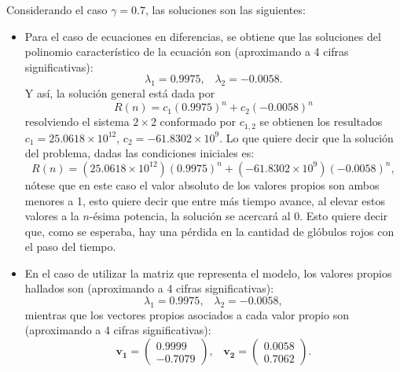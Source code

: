 Considerando el caso $\gamma = 0.7$, las soluciones son las siguientes:
\begin{itemize}
    \item Para el caso de ecuaciones en diferencias, se obtiene que las soluciones del polinomio característico de la ecuación son (aproximando a 4 cifras significativas):
        $$\lambda_1 = 0.9975,\;\;\; \lambda_2 = -0.0058.$$
        Y así, la solución general está dada por 
        $$R(n)=c_1(0.9975)^n+c_2(-0.0058)^n$$
        resolviendo el sistema $2\times 2$ conformado por $c_{1,2}$ se obtienen los resultados $c_1=25.0618\times 10^{12}$, $c_2 = -61.8302\times 10^{9}$. Lo que quiere decir que la solución del problema, dadas las condiciones iniciales es:
        $$R(n)=(25.0618\times 10^{12})(0.9975)^n+(-61.8302\times 10^{9})(-0.0058)^n,$$
        nótese que en este caso el valor absoluto de los valores propios son ambos menores a 1, esto quiere decir que entre más tiempo avance, al elevar estos valores a la $n$-ésima potencia, la solución se acercará al 0. Esto quiere decir que, como se esperaba, hay una pérdida en la cantidad de glóbulos rojos con el paso del tiempo.
    \item En el caso de utilizar la matriz que representa el modelo, los valores propios hallados son (aproximando a 4 cifras significativas):
        $$\lambda_1 = 0.9975, \;\;\; \lambda_2 = -0.0058,$$
        mientras que los vectores propios asociados a cada valor propio son (aproximando a 4 cifras significativas):
        $$\mathbf{v_1}=\begin{pmatrix}
            0.9999  \\ 
            -0.7079
            \end{pmatrix},\;\;\;  \mathbf{v_2}=\begin{pmatrix}
            0.0058  \\
            0.7062
            \end{pmatrix}.$$

\end{itemize}

